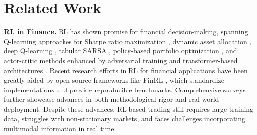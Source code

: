 
\section{Related Work}
\label{sec:related-work}

\textbf{RL in Finance.}
RL has shown promise for financial decision-making, spanning Q-learning approaches for Sharpe ratio maximization \cite{gao2000algorithm}, dynamic asset allocation \cite{jangmin2006adaptive}, deep Q-learning \cite{jeong2019improving}, tabular SARSA \cite{de2020tabular}, policy-based portfolio optimization \cite{shi2019multi}, and actor-critic methods \cite{ye2020reinforcement} enhanced by adversarial training \cite{liang2018adversarial} and transformer-based architectures \cite{huang2024novel}. 
Recent research efforts in RL for financial applications have been greatly aided by open-source frameworks like FinRL \cite{liu2022finrl}, which standardize implementations and provide reproducible benchmarks. Comprehensive surveys \cite{hambly2023recent,sun2023reinforcement} further showcase advances in both methodological rigor and real-world deployment.
Despite these advances, RL-based trading still requires large training data, struggles with non-stationary markets, and faces challenges incorporating multimodal information in real time.



